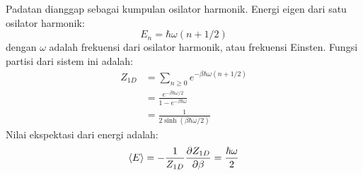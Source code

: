 Padatan dianggap sebagai kumpulan osilator harmonik.
Energi eigen dari satu osilator harmonik:
\begin{equation}
E_{n} = \hbar \omega ( n + 1/2 )
\end{equation}
dengan $\omega$ adalah frekuensi dari osilator harmonik, atau
frekuensi Einsten.
Fungsi partisi dari sistem ini adalah:
\begin{align*}
Z_{1D} & = \sum_{n \geq 0} e^{-\beta\hbar\omega(n + 1/2)} \\
& = \frac{e^{-\beta\hbar\omega/2}}{1 - e^{-\beta\hbar\omega}} \\
& = \frac{1}{2\sinh(\beta\hbar\omega/2)}
\end{align*}
Nilai ekspektasi dari energi adalah:
\begin{align*}
\braket{E} = -\frac{1}{Z_{1D}}\frac{\partial Z_{1D}}{\partial \beta}
= \frac{\hbar\omega}{2}
\end{align*}

